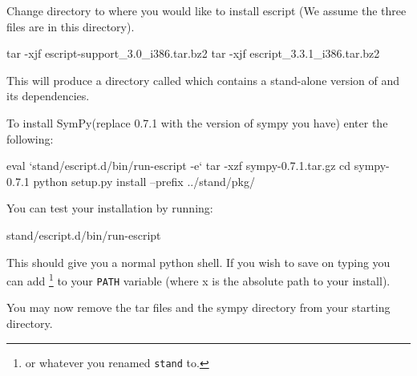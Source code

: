 Change directory to where you would like to install escript (We assume the three files are in this directory).

\begin{shellCode}
tar -xjf escript-support_3.0_i386.tar.bz2
tar -xjf escript_3.3.1_i386.tar.bz2

\end{shellCode}
This will produce a directory called  which contains a stand-alone version of \esfinley and its dependencies.

\noindent To install SymPy(replace 0.7.1 with the version of sympy you have) enter the following:
\begin{shellCode}
eval `stand/escript.d/bin/run-escript -e`
tar -xzf sympy-0.7.1.tar.gz 
cd sympy-0.7.1
python setup.py install --prefix ../stand/pkg/
\end{shellCode}

You can test your installation by running:
\begin{shellCode}
stand/escript.d/bin/run-escript
\end{shellCode}
This should give you a normal python shell.
If you wish to save on typing you can add \footnote{or whatever you renamed \texttt{stand} to.} to your \texttt{PATH} variable (where x is the absolute path to your install).

You may now remove the tar files and the sympy directory from your starting directory.
